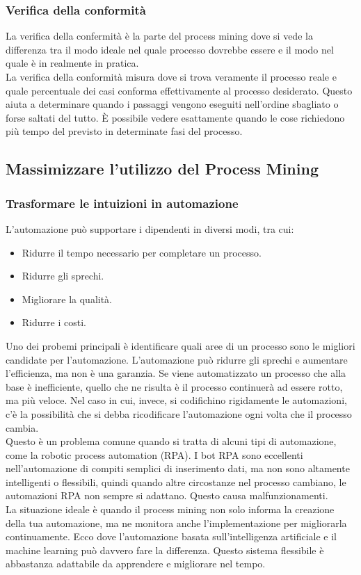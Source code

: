 \documentclass{article}
\begin{document}
\subsubsection{Verifica della conformità}
La verifica della confermità è la parte del process mining dove si vede la differenza tra il modo ideale nel quale processo dovrebbe essere e il modo nel quale è in realmente in pratica.\\
La verifica della conformità misura dove si trova veramente il processo reale e quale percentuale dei casi conforma effettivamente al processo desiderato. Questo aiuta a determinare quando i passaggi vengono eseguiti nell'ordine sbagliato o forse saltati del tutto. È possibile vedere esattamente quando le cose richiedono più tempo del previsto in determinate fasi del processo.

\subsection{Massimizzare l'utilizzo del Process Mining}
\subsubsection{Trasformare le intuizioni in automazione}
L'automazione può supportare i dipendenti in diversi modi, tra cui:
\begin{itemize}
    \item Ridurre il tempo necessario per completare un processo.
    \item Ridurre gli sprechi.
    \item Migliorare la qualità.
    \item Ridurre i costi.
\end{itemize}
Uno dei probemi principali è identificare quali aree di un processo sono le migliori candidate per l'automazione. L'automazione può ridurre gli sprechi e aumentare l'efficienza, ma non è una garanzia. Se viene automatizzato un processo che alla base è inefficiente, quello che ne risulta è il processo continuerà ad essere rotto, ma più veloce. Nel caso in cui, invece, si codifichino rigidamente le automazioni, c'è la possibilità che si debba ricodificare l'automazione ogni volta che il processo cambia.\\
Questo è un problema comune quando si tratta di alcuni tipi di automazione, come la robotic process automation (RPA). I bot RPA sono eccellenti nell'automazione di compiti semplici di inserimento dati, ma non sono altamente intelligenti o flessibili, quindi quando altre circostanze nel processo cambiano, le automazioni RPA non sempre si adattano. Questo causa malfunzionamenti.\\
La situazione ideale è quando il process mining non solo informa la creazione della tua automazione, ma ne monitora anche l'implementazione per migliorarla continuamente. Ecco dove l'automazione basata sull'intelligenza artificiale e il machine learning può davvero fare la differenza. Questo sistema flessibile è abbastanza adattabile da apprendere e migliorare nel tempo.
\end{document}
